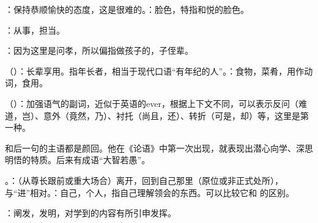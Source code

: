 {
\item {}：保持恭顺愉快的态度，这是很难的。：脸色，特指和悦的脸色。
\item {}：从事，担当。
\item {}：因为这里是问孝，所以偏指做孩子的，子侄辈。
\item {}（）：长辈享用。指年长者，相当于现代口语“有年纪的人”。：食物，菜肴，用作动词，食用。
\item {}（）：加强语气的副词，近似于英语的ever，根据上下文不同，可以表示反问（难道，岂）、意外（竟然，乃）、衬托（尚且，还）、转折（可是，却）等，这里是第一种。
}
{}


{
\item {}和后一句的主语都是颜回。他在《论语》中第一次出现，就表现出潜心向学、深思明悟的特质。后来有成语“大智若愚”。
\item {}。：（从尊长跟前或重大场合）离开，回到自己那里（原位或非正式处所），与“进”相对。：自己，个人，指自己理解领会的东西。可以比较它和  的区别。
\item {}：阐发，发明，对学到的内容有所引申发挥。
}
{}


